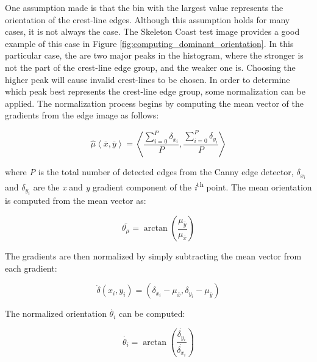   One assumption made is that the bin with the largest value represents the orientation of the crest-line edges. Although this assumption holds for many cases, it is not always the case. The Skeleton Coast test image provides a good example of this case in Figure \ref{fig:computing_dominant_orientation}. In this particular case, the are two major peaks in the histogram, where the stronger is not the part of the crest-line edge group, and the weaker one is. Choosing the higher peak will cause invalid crest-lines to be chosen. In order to determine which peak best represents the crest-line edge group, some normalization can be applied. The normalization process begins by computing the mean vector of the gradients from the edge image as follows:
  
  \begin{equation}
  \hat{\mu}\left\langle \bar{x},\bar{y}\right\rangle =\left\langle \frac{\sum_{i=0}^{P}\delta_{x_{i}}}{P},\frac{\sum_{i=0}^{P}\delta_{y_{i}}}{P}\right\rangle 
  \end{equation}
  
  where \emph{P} is the total number of detected edges from the Canny edge detector, $\delta_{x_{i}}$ and $\delta_{y_{i}}$ are the \emph{x} and \emph{y} gradient component of the \emph{i}\textsuperscript{th} point. The mean orientation is computed from the mean vector as:
  
  \begin{equation}
\bar{\theta_{\mu}}=\arctan\left(\frac{\mu_{\bar{y}}}{\mu_{\bar{x}}}\right)
  \end{equation}
  
  The gradients are then normalized by simply subtracting the mean vector from each gradient:
  
  \begin{equation}
\dot{\delta}\left(x_{i},y_{i}\right)=\left(\delta_{x_{i}}-\mu_{\bar{x}},\delta_{y_{i}}-\mu_{\bar{y}}\right)
  \end{equation}
  
  The normalized orientation $\dot{\theta_{i}}$ can be computed:
  
  \begin{equation}
  \dot{\theta_{i}}=\arctan\left(\frac{\dot{\delta_{y_{i}}}}{\dot{\delta_{x_{i}}}}\right)
  \end{equation}

